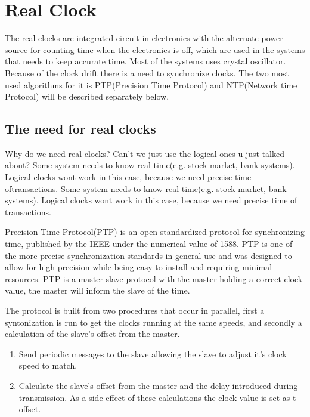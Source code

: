 \section{Real Clock}\label{sc:realClock}

The real clocks are integrated circuit in electronics with the alternate power source for counting time when the electronics is off, which are used in the systems that needs to keep accurate time. Most of the systems uses crystal oscillator. Because of the clock drift there is a need to synchronize clocks. The two most used algorithms for it is PTP(Precision Time Protocol) and NTP(Network time Protocol) will be described separately below.

\subsection{The need for real clocks}

Why do we need real clocks? Can't we just use the logical ones u just talked about?
Some system needs to know real time(e.g. stock market, bank systems). Logical clocks wont work in this case, because we need precise time oftransactions.
Some system needs to know real time(e.g. stock market, bank systems). Logical clocks wont work in this
case, because we need precise time of transactions.



Precision Time Protocol(PTP) is an open standardized protocol for synchronizing time, published by the IEEE under the numerical value of 1588. PTP is one of the more precise synchronization standards in general use and was designed to allow for high precision while being easy to install and requiring minimal resources. PTP is a master slave protocol with the master holding a correct clock value, the master will inform the slave of the time.

\noindent The protocol is built from two procedures that occur in parallel, first a syntonization is run to get the clocks running at the same speeds, and secondly a calculation of the slave's offset from the master. 
\begin{enumerate}
\item Send periodic messages to the slave allowing the slave to adjust it's clock speed to match.
\item Calculate the slave's offset from the master and the delay introduced during transmission. As a side effect of these calculations the clock value is set as t - offset.
\end{enumerate}

